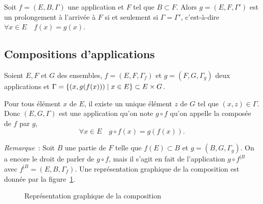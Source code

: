 Soit \(f=(E,B,\Gamma)\) une application et \(F\) tel que \(B \subset F\). Alors 
\(g=(E,F,\Gamma')\) est un prolongement à l'arrivée à \(F\) si et seulement si 
\(\Gamma = \Gamma'\), c'est-à-dire \(\forall x \in E \quad f(x)=g(x)\).

\subsection{Compositions d'applications}
\label{chap3-subsec:compapp}

\begin{defdef}
    Soient \(E,F\) et \(G\) des ensembles, \(f=(E,F,\Gamma_f)\) et \(g=(F,G, 
    \Gamma_g)\) deux applications et \(\Gamma = \left\{(x,g(f(x)))\mathrel{}\middle|\mathrel{}x \in E\right\} \subset 
    E \times G\).
\end{defdef}

Pour tous élément \(x\) de \(E\), il existe un unique élément \(z\) de \(G\) tel 
que \((x,z) \in \Gamma\). Donc \((E,G,\Gamma)\) est une application qu'on note 
\(g \circ f\) qu'on appelle la composée de \(f\) par \(g\),
\begin{equation}
    \forall x \in E \quad g \circ f(x)=g(f(x)).
\end{equation}

\emph{Remarque}~: Soit \(B\) une partie de \(F\) telle que \(f(E) \subset B\) et 
\(g=(B,G,\Gamma_g)\). On a encore le droit de parler de \(g \circ f\), mais il 
s'agit en fait de l'application \(g \circ f^{|B}\) avec \( f^{|B} 
=(E,B,\Gamma_f)\).
Une représentation graphique de la composition est donnée par la 
figure~\ref{chap3-fig:compose}.

\begin{figure}
    \centering
    \caption{Représentation graphique de la composition}
    \label{chap3-fig:compose}
\end{figure}

